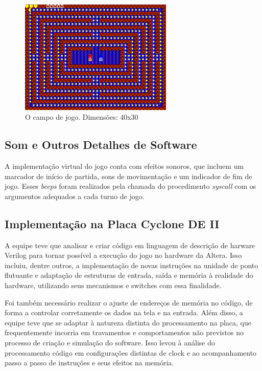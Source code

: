 \documentclass[12pt, a4paper, twocolumn]{article}
\begin{document}
\begin{figure}[h!]
    \centering
    \includegraphics[width=0.65\textwidth]{JOGO1.png}
    \caption{O campo de jogo. Dimensões: 40x30}
\end{figure}


\subsection{Som e Outros Detalhes de Software}

A implementação virtual do jogo conta com efeitos sonoros, que incluem um marcador de início de partida, sons de movimentação e um indicador de fim de jogo. Esses \textit{beeps} foram realizados pela chamada do procedimento \textit{syscall} com os argumentos adequados a cada turno de jogo.

\subsection{Implementação na Placa Cyclone DE II}

A equipe teve que analisar e criar código em linguagem de descrição de harware Verilog para tornar possível a execução do jogo no hardware da Altera. Isso incluiu, dentre outros, a implementação de novas instruções na unidade de ponto flutuante e adaptação de estruturas de entrada, saída e memória à realidade do hardware, utilizando seus mecanismos e switches com essa finalidade.

Foi também necessário realizar o ajuste de endereços de memória no código, de forma a controlar corretamente os dados na tela e na entrada. Além disso, a equipe teve que se adaptar à natureza distinta do processamento na placa, que frequentemente incorria em travamentos e comportamentos não previstos no processo de criação e simulação do software. Isso levou à análise do processamento código em configurações distintas de clock e ao acompanhamento passo a passo de instruções e seus efeitos na memória.
\end{document}
